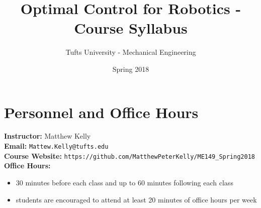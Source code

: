 \documentclass[onecolumn]{article}
\title{Optimal Control for Robotics - Course Syllabus}
\date{Spring 2018}
\author{Tufts University - Mechanical Engineering}
\begin{document}
\maketitle

\section*{Personnel and Office Hours}

\textbf{Instructor: }  Matthew Kelly \\
\textbf{Email: }  \texttt{Mattew.Kelly@tufts.edu}\\
\textbf{Course Website: }  \texttt{https://github.com/MatthewPeterKelly/ME149\_Spring2018} \\
\textbf{Office Hours: }
\vspace{-0.6em} \begin{itemize}  \setlength\itemsep{-0.4em}
  \item 30 minutes before each class and up to 60 minutes following each class
  \item students are encouraged to attend at least 20 minutes of office hours per week
\end{itemize}
\end{document}

